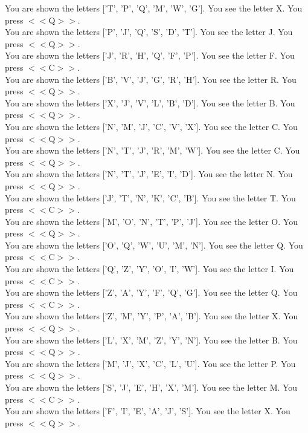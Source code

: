 \documentclass[pdflatex,sn-nature]{sn-jnl}%
\theoremstyle{thmstyleone}%
\theoremstyle{thmstyletwo}%
\theoremstyle{thmstylethree}%
\begin{document}
You are shown the letters ['T', 'P', 'Q', 'M', 'W', 'G']. You see the letter X. You press $<<$Q$>>$. $~$\\ 
You are shown the letters ['P', 'J', 'Q', 'S', 'D', 'T']. You see the letter J. You press $<<$Q$>>$. $~$\\ 
You are shown the letters ['J', 'R', 'H', 'Q', 'F', 'P']. You see the letter F. You press $<<$C$>>$. $~$\\ 
You are shown the letters ['B', 'V', 'J', 'G', 'R', 'H']. You see the letter R. You press $<<$Q$>>$. $~$\\ 
You are shown the letters ['X', 'J', 'V', 'L', 'B', 'D']. You see the letter B. You press $<<$Q$>>$. $~$\\ 
You are shown the letters ['N', 'M', 'J', 'C', 'V', 'X']. You see the letter C. You press $<<$Q$>>$. $~$\\ 
You are shown the letters ['N', 'T', 'J', 'R', 'M', 'W']. You see the letter C. You press $<<$Q$>>$. $~$\\ 
You are shown the letters ['N', 'T', 'J', 'E', 'I', 'D']. You see the letter N. You press $<<$Q$>>$. $~$\\ 
You are shown the letters ['J', 'T', 'N', 'K', 'C', 'B']. You see the letter T. You press $<<$C$>>$. $~$\\ 
You are shown the letters ['M', 'O', 'N', 'T', 'P', 'J']. You see the letter O. You press $<<$Q$>>$. $~$\\ 
You are shown the letters ['O', 'Q', 'W', 'U', 'M', 'N']. You see the letter Q. You press $<<$C$>>$. $~$\\ 
You are shown the letters ['Q', 'Z', 'Y', 'O', 'I', 'W']. You see the letter I. You press $<<$C$>>$. $~$\\ 
You are shown the letters ['Z', 'A', 'Y', 'F', 'Q', 'G']. You see the letter Q. You press $<<$C$>>$. $~$\\ 
You are shown the letters ['Z', 'M', 'Y', 'P', 'A', 'B']. You see the letter X. You press $<<$Q$>>$. $~$\\ 
You are shown the letters ['L', 'X', 'M', 'Z', 'Y', 'N']. You see the letter B. You press $<<$Q$>>$. $~$\\ 
You are shown the letters ['M', 'J', 'X', 'C', 'L', 'U']. You see the letter P. You press $<<$Q$>>$. $~$\\ 
You are shown the letters ['S', 'J', 'E', 'H', 'X', 'M']. You see the letter M. You press $<<$C$>>$. $~$\\ 
You are shown the letters ['F', 'I', 'E', 'A', 'J', 'S']. You see the letter X. You press $<<$Q$>>$. $~$\\ 
\end{document}

